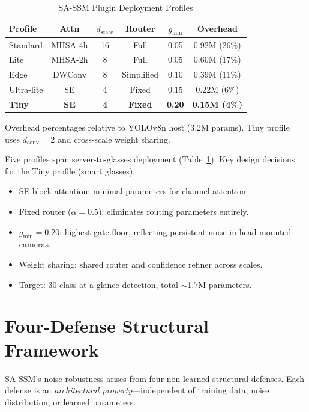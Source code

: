 \documentclass[conference]{IEEEtran}
\begin{document}
\begin{table}[t]
\centering
\caption{SA-SSM Plugin Deployment Profiles}
\label{tab:profiles}
\small
\begin{tabular}{@{}lccccc@{}}
\toprule
Profile & Attn & $d_\text{state}$ & Router & $g_{\min}$ & Overhead \\
\midrule
Standard & MHSA-4h & 16 & Full & 0.05 & 0.92M (26\%) \\
Lite & MHSA-2h & 8 & Full & 0.05 & 0.60M (17\%) \\
Edge & DWConv & 8 & Simplified & 0.10 & 0.39M (11\%) \\
Ultra-lite & SE & 4 & Fixed & 0.15 & 0.22M (6\%) \\
\textbf{Tiny} & \textbf{SE} & \textbf{4} & \textbf{Fixed} & \textbf{0.20} & \textbf{0.15M (4\%)} \\
\bottomrule
\end{tabular}
\vspace{0.5em}

{\footnotesize Overhead percentages relative to YOLOv8n host (3.2M params). Tiny profile uses $d_\text{conv}=2$ and cross-scale weight sharing.}
\end{table}

Five profiles span server-to-glasses deployment (Table~\ref{tab:profiles}). Key design decisions for the Tiny profile (smart glasses):
\begin{itemize}
\item SE-block attention: minimal parameters for channel attention.
\item Fixed router ($\alpha = 0.5$): eliminates routing parameters entirely.
\item $g_{\min} = 0.20$: highest gate floor, reflecting persistent noise in head-mounted cameras.
\item Weight sharing: shared router and confidence refiner across scales.
\item Target: 30-class at-a-glance detection, total ${\sim}$1.7M parameters.
\end{itemize}

\section{Four-Defense Structural Framework}
\label{sec:defenses}

SA-SSM's noise robustness arises from four non-learned structural defenses. Each defense is an \emph{architectural property}---independent of training data, noise distribution, or learned parameters.
\end{document}
